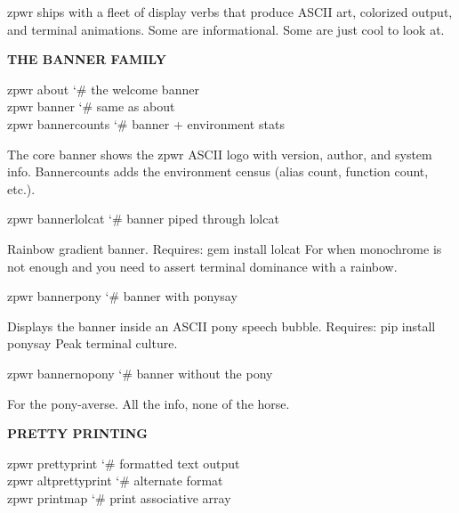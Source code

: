\documentclass[11pt,a4paper,twoside]{book}
\begin{document}
zpwr ships with a fleet of display verbs that produce ASCII art, colorized output, and terminal animations. Some are informational. Some are just cool to look at.


\vspace{12pt}
{\bfseries\color{neonyellow} THE BANNER FAMILY}\vspace{4pt}

\begin{codebox}
\color{neongreen}zpwr about                          {\char`\#} the welcome banner\\
\color{neongreen}zpwr banner                         {\char`\#} same as about\\
\color{neongreen}zpwr bannercounts                   {\char`\#} banner + environment stats\\
\end{codebox}

The core banner shows the zpwr ASCII logo with version, author, and system info. Bannercounts adds the environment census (alias count, function count, etc.).

\begin{codebox}
\color{neongreen}zpwr bannerlolcat                   {\char`\#} banner piped through lolcat\\
\end{codebox}

Rainbow gradient banner. Requires: gem install lolcat For when monochrome is not enough and you need to assert terminal dominance with a rainbow.

\begin{codebox}
\color{neongreen}zpwr bannerpony                     {\char`\#} banner with ponysay\\
\end{codebox}

Displays the banner inside an ASCII pony speech bubble. Requires: pip install ponysay Peak terminal culture.

\begin{codebox}
\color{neongreen}zpwr bannernopony                   {\char`\#} banner without the pony\\
\end{codebox}

For the pony-averse. All the info, none of the horse.


\vspace{12pt}
{\bfseries\color{neonyellow} PRETTY PRINTING}\vspace{4pt}

\begin{codebox}
\color{neongreen}zpwr prettyprint                    {\char`\#} formatted text output\\
\color{neongreen}zpwr altprettyprint                 {\char`\#} alternate format\\
\color{neongreen}zpwr printmap                       {\char`\#} print associative array\\
\end{codebox}
\end{document}
